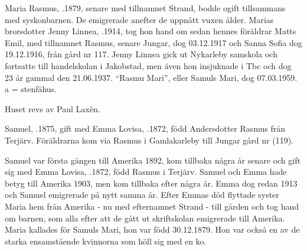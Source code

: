

Maria Rasmus, .1879, senare med tillnamnet Strand, bodde ogift tillsammans med syskonbarnen. De emigrerade anefter de uppnått vuxen ålder. Marias brorsdotter Jenny Linnea, .1914, tog hon hand om sedan hennes föräldrar Matts Emil, med tillnamnet Rasmus, senare Jungar, dog 03.12.1917 och Sanna Sofia dog 19.12.1916, från	gård nr 117. Jenny Linnea gick ut Nykarleby samskola och fortsatte till handelskolan i Jakobstad, men även hon insjuknade i Tbc och dog 23 år gammal den 21.06.1937. ``Rasmu Mari'', eller Samuls Mari, dog 07.03.1959. a = stenfähus.

Huset revs av Paul Laxèn.

Samuel, .1875, gift med Emma Lovisa, .1872, född Andersdotter Rasmus från Terjärv. Föräldrarna kom via Rasmus i Gamlakarleby till Jungar gård nr (119).
\begin{jhchildren}
  \item {}
  \item {}
  \item {}
  \item {}
  \item {}
  \item {}
\end{jhchildren}
Samuel var första gången till Amerika 1892, kom tillbaka några år senare och gift sig med Emma Lovisa, .1872, född Rasmus i Terjärv. Samuel och Emma hade betyg till Amerika 1903, men kom tillbaka efter några år. Emma dog redan 1913 och Samuel emigrerade på nytt samma år. Efter Emmas död flyttade syster Maria hem från Amerika - nu med efternamnet Strand - till gården och tog hand om barnen, som alla	efter att de gått ut skriftskolan emigrerade till Amerika. Maria kallades för Samuls Mari, hon var född 30.12.1879. Hon var också en av de starka ensamstående kvinnorna som höll sig med en ko.


